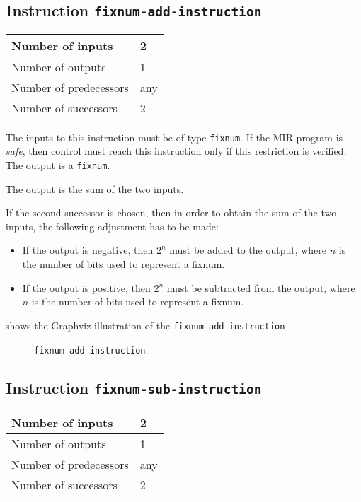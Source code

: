 \subsection{Instruction \texttt{fixnum-add-instruction}}
\label{mir-instruction-fixnum-add}

\begin{tabular}{|l|l|}
\hline
Number of inputs & 2\\
\hline
Number of outputs & 1\\
\hline
Number of predecessors & any\\
\hline
Number of successors & 2\\
\hline
\end{tabular}

The inputs to this instruction must be of type \texttt{fixnum}.  If the
MIR program is \emph{safe}, then control must reach this instruction
only if this restriction is verified.  The output is a
\texttt{fixnum}.  

The output is the sum of the two inputs.

If the second successor is chosen, then in order to obtain the sum of the
two inputs, the following adjustment has to be made:

\begin{itemize}
\item If the output is negative, then $2^n$ must be added to the
  output, where $n$ is the number of bits used to represent a fixnum. 
\item If the output is positive, then $2^n$ must be subtracted from
  the output, where $n$ is the number of bits used to represent a
  fixnum.
\end{itemize}

 shows the Graphviz illustration of the
\texttt{fixnum-add-instruction}

\begin{figure}
\begin{center}
\end{center}
\caption{\label{fig-fixnum-add-instruction}
\texttt{fixnum-add-instruction}.}
\end{figure}

\subsection{Instruction \texttt{fixnum-sub-instruction}}
\label{mir-instruction-fixnum-sub}

\begin{tabular}{|l|l|}
\hline
Number of inputs & 2\\
\hline
Number of outputs & 1\\
\hline
Number of predecessors & any\\
\hline
Number of successors & 2\\
\hline
\end{tabular}

